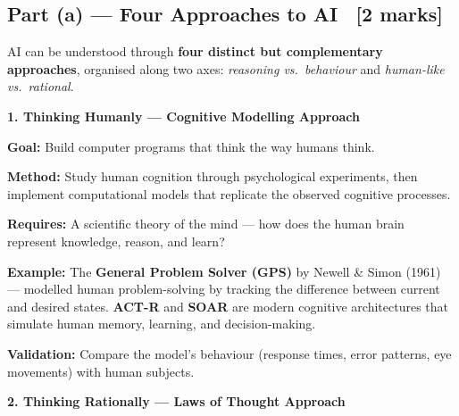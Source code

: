 \documentclass[12pt, a4paper]{article}
\begin{document}
\subsection{Part (a) — Four Approaches to AI \ [2 marks]}

\noindent AI can be understood through \textbf{four distinct but complementary approaches}, organised along two axes: \textit{reasoning vs.\ behaviour} and \textit{human-like vs.\ rational}.

\vspace{0.5em}

\noindent\textbf{1. Thinking Humanly — Cognitive Modelling Approach}

\begin{keypoints}
  \item \textbf{Goal:} Build computer programs that think the way humans think.
  \item \textbf{Method:} Study human cognition through psychological experiments, then implement computational models that replicate the observed cognitive processes.
  \item \textbf{Requires:} A scientific theory of the mind — how does the human brain represent knowledge, reason, and learn?
  \item \textbf{Example:} The \textbf{General Problem Solver (GPS)} by Newell \& Simon (1961) — modelled human problem-solving by tracking the difference between current and desired states. \textbf{ACT-R} and \textbf{SOAR} are modern cognitive architectures that simulate human memory, learning, and decision-making.
  \item \textbf{Validation:} Compare the model's behaviour (response times, error patterns, eye movements) with human subjects.
\end{keypoints}

\vspace{0.4em}

\noindent\textbf{2. Thinking Rationally — Laws of Thought Approach}
\end{document}

